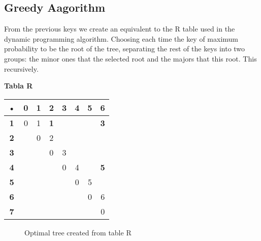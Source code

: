 \documentclass[a4paper,twocolumn,10pt]{article}
\begin{document}
\subsection{Greedy Aagorithm} 
From the previous keys we create an equivalent to the R table used in the dynamic programming algorithm. Choosing each time the key of maximum probability to be the root of the tree, separating the rest of the keys into two groups: the minor ones that the selected root and the majors that this root. This recursively. 
\begin{center} 
\textbf{Tabla R} \\ 
\begin{tabular}{|c|c|c|c|c|c|c|c|}
\hline \textbf{•} & \textbf{0}& \textbf{1}& \textbf{2}& \textbf{3}& \textbf{4}& \textbf{5}& \textbf{6}\\ \hline 
\textbf{1} & 0 & 1 & \textbf{1} &  &  &  & \textbf{3} \\ 
\hline 
\textbf{2} &  & 0 & 2 &  &  &  &  \\ 
\hline 
\textbf{3} &  &  & 0 & 3 &  &  &  \\ 
\hline 
\textbf{4} &  &  &  & 0 & 4 &  & \textbf{5} \\ 
\hline 
\textbf{5} &  &  &  &  & 0 & 5 &  \\ 
\hline 
\textbf{6} &  &  &  &  &  & 0 & 6 \\ 
\hline 
\textbf{7} &  &  &  &  &  &  & 0 \\ 
\hline 
\end{tabular} 
\end{center} 
\begin{figure}[H] 
\begin{center} 
Optimal tree created from table R \\ 
{ 
}  
\end{center} 
\end{figure} 
\end{document}
